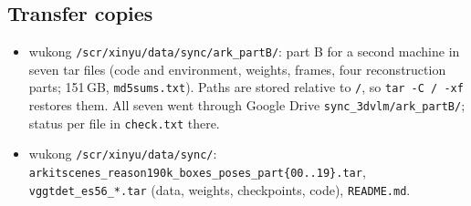 \subsection{Transfer copies}

\begin{itemize}
\item wukong \texttt{/scr/xinyu/data/sync/ark\_partB/}: part B for a second machine in seven tar files (code and
      environment, weights, frames, four reconstruction parts; 151\,GB, \texttt{md5sums.txt}). Paths are stored
      relative to \texttt{/}, so \texttt{tar -C / -xf} restores them. All seven went through Google Drive
      \texttt{sync\_3dvlm/ark\_partB/}; status per file in \texttt{check.txt} there.
\item wukong \texttt{/scr/xinyu/data/sync/}: \texttt{arkitscenes\_reason190k\_boxes\_poses\_part\{00..19\}.tar},
      \texttt{vggtdet\_es56\_*.tar} (data, weights, checkpoints, code), \texttt{README.md}.
\end{itemize}
